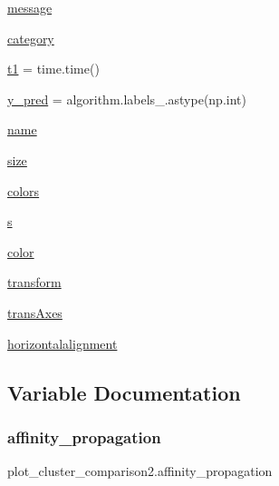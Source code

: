 \begin{DoxyCompactItemize}
\item 
\hyperlink{namespaceplot__cluster__comparison2_a57818f3c200c281c8a30a63bedac8da3}{message}
\item 
\hyperlink{namespaceplot__cluster__comparison2_ae126a9ef6885220be630cd02aa30de8a}{category}
\item 
\hyperlink{namespaceplot__cluster__comparison2_a95f358fe3791a3aec68e0467aa17fcb4}{t1} = time.\+time()
\item 
\hyperlink{namespaceplot__cluster__comparison2_a9d1bf5d100bb479fa16b26fee69366f5}{y\+\_\+pred} = algorithm.\+labels\+\_\+.\+astype(np.\+int)
\item 
\hyperlink{namespaceplot__cluster__comparison2_ac44b40b6e13b88835eff58b483aa8f67}{name}
\item 
\hyperlink{namespaceplot__cluster__comparison2_a6a3332a10a5b9edf05f64738219919b7}{size}
\item 
\hyperlink{namespaceplot__cluster__comparison2_a54fe608837b53264e1d69be6351c38b0}{colors}
\item 
\hyperlink{namespaceplot__cluster__comparison2_a2704bf1068dbe6dda7ffc7eb412b5f79}{s}
\item 
\hyperlink{namespaceplot__cluster__comparison2_ae6a55faa6ab39d7dd2a787ee97c9fd35}{color}
\item 
\hyperlink{namespaceplot__cluster__comparison2_a815e09f0f879d76e9d310bbf9324dc7f}{transform}
\item 
\hyperlink{namespaceplot__cluster__comparison2_a77093a291bee22059342978f74a1ef22}{trans\+Axes}
\item 
\hyperlink{namespaceplot__cluster__comparison2_ae7c7ed614247a1f011b633f07bb06264}{horizontalalignment}
\end{DoxyCompactItemize}


\subsection{Variable Documentation}
\mbox{\label{namespaceplot__cluster__comparison2_a1785faecb1c7f09e7d7ed7c686cc54c6}} 
\subsubsection{\texorpdfstring{affinity\+\_\+propagation}{affinity\_propagation}}
{\footnotesize\ttfamily plot\+\_\+cluster\+\_\+comparison2.\+affinity\+\_\+propagation}

